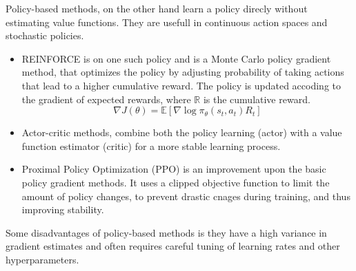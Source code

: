 Policy-based methods, on the other hand learn a policy direcly without estimating
value functions. They are usefull in continuous action spaces and stochastic policies.
\begin{itemize}
      \item REINFORCE is on one such policy and is a Monte Carlo policy gradient method, 
      that optimizes the policy by adjusting probability of taking actions that lead to a 
      higher cumulative reward. The policy is updated accoding to the gradient of expected rewards,
      where \(\mathbb{R}\) is the cumulative reward. \cite{Types-of-Reinforcement-Learning}
      \begin{equation}
            \nabla J(\theta) = \mathbb{E} \left[\nabla \log \pi_{\theta}(s_t,a_t) R_t \right]
            \label{equation:policy_gradient}
      \end{equation}
      \item Actor-critic methods, combine both the policy learning (actor) with a value
      function estimator (critic) for a more stable learning process. \cite{Types-of-Reinforcement-Learning}
      \item Proximal Policy Optimization (PPO) is an improvement upon the basic policy
      gradient methods. It uses a clipped objective function to limit the amount of policy 
      changes, to prevent drastic cnages during training, and thus improving stability. \cite{Types-of-Reinforcement-Learning}
\end{itemize}
Some disadvantages of policy-based methods is they have a high variance in gradient estimates and often requires careful 
tuning of learning rates and other hyperparameters. \cite{Types-of-Reinforcement-Learning}

